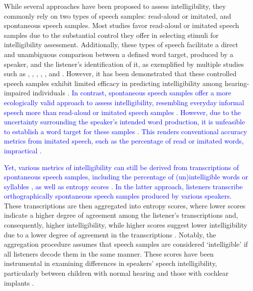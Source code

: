 \documentclass[
  authoryear,
  preprint,
  1p]{elsarticle}
\begin{document}
While several approaches have been proposed to assess intelligibility,
they commonly rely on two types of speech samples: read-aloud or
imitated, and spontaneous speech samples. Most studies favor read-aloud
or imitated speech samples due to the substantial control they offer in
selecting stimuli for intelligibility assessment. Additionally, these
types of speech facilitate a direct and unambiguous comparison between a
defined word target, produced by a speaker, and the listener's
identification of it, as exemplified by multiple studies such as
\citet{Castellanos_et_al_2014}, \citet{Chin_et_al_2012},
\citet{Chin_et_al_2014}, \citet{Freeman_et_al_2017},
\citet{Khwaileh_et_al_2010}, and \citet{Montag_et_al_2014}. However, it
has been demonstrated that these controlled speech samples exhibit
limited efficacy in predicting intelligibility among hearing-impaired
individuals \citep{Cox_et_al_1989, Ertmer_2011}. \textcolor{blue}{In contrast,
spontaneous speech samples offer a more ecologically valid approach to
assess intelligibility, resembling everyday informal speech more than
read-aloud or imitated speech samples \citep{Boonen_et_al_2021}.
However, due to the uncertainty surrounding the speaker's intended word
production, it is unfeasible to establish a word target for these
samples \citep{Flipsen_2006, Lagerberg_et_al_2014}. This renders
conventional accuracy metrics from imitated speech, such as the
percentage of read or imitated words, impractical
\citep{Boonen_et_al_2021}.}

\textcolor{blue}{Yet, various metrics of intelligibility can still be derived from
transcriptions of spontaneous speech samples, including the percentage
of (un)intelligible words or syllables
\citep{Flipsen_2006, Lagerberg_et_al_2014}, as well as entropy scores
\citep{Boonen_et_al_2021}. In the latter approach, listeners transcribe
orthographically spontaneous speech samples produced by various
speakers.} These transcriptions are then aggregated into entropy scores,
where lower scores indicate a higher degree of agreement among the
listener's transcriptions and, consequently, higher intelligibility,
while higher scores suggest lower intelligibility due to a lower degree
of agreement in the transcriptions
\citep{Boonen_et_al_2021, Faes_et_al_2022}. Notably, the aggregation
procedure assumes that speech samples are considered `intelligible' if
all listeners decode them in the same manner. These scores have been
instrumental in examining differences in speakers' speech
intelligibility, particularly between children with normal hearing and
those with cochlear implants \citep{Boonen_et_al_2021}.
\end{document}
